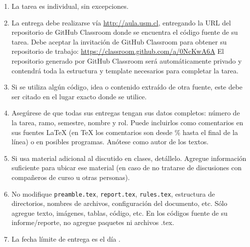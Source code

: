 \begin{enumerate}[(1)]
  \item La tarea es individual, sin excepciones.

  \item La entrega debe realizarse vía \url{http://aula.usm.cl}, entregando la URL del repositorio de GitHub Classroom donde se encuentra el código fuente de su tarea.  
  Debe aceptar la invitación de GitHub Classroom para obtener su repositorio de trabajo:  
  \url{https://classroom.github.com/a/0NcKwA6A}  
  El repositorio generado por GitHub Classroom será automáticamente privado y contendrá toda la estructura y template necesarios para completar la tarea.

  \item Si se utiliza algún código, idea o contenido extraído de otra fuente, este debe ser citado en el lugar exacto donde se utilice.

  \item Asegúrese de que todas sus entregas tengan sus datos completos: número de la tarea, ramo, semestre, nombre y rol. Puede incluirlos como comentarios en sus fuentes \LaTeX{} (en \TeX{} los comentarios son desde \% hasta el final de la línea) o en posibles programas. Anótese como autor de los textos.

  \item Si usa material adicional al discutido en clases, detállelo. Agregue información suficiente para ubicar ese material (en caso de no tratarse de discusiones con compañeros de curso u otras personas).

  \item No modifique \texttt{preamble.tex}, \texttt{report.tex}, \texttt{rules.tex}, estructura de directorios, nombres de archivos, configuración del documento, etc. Sólo agregue texto, imágenes, tablas, código, etc. En los códigos fuente de su informe/reporte, no agregue paquetes ni archivos .tex.

  \item La fecha límite de entrega es el día .
\end{enumerate}

